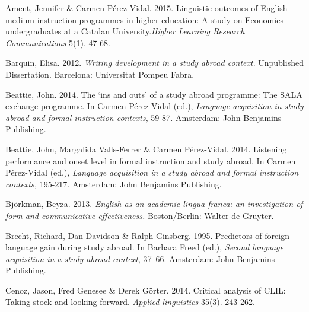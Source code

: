 \begin{styleStandard}
Ament, Jennifer \& Carmen Pérez Vidal. 2015. Linguistic outcomes of English medium instruction programmes in higher education: A study on Economics undergraduates at a Catalan University.\textit{Higher Learning Research Communications} 5(1). 47-68.
\end{styleStandard}


\begin{styleStandard}
Barquin, Elisa. 2012. \textit{Writing development in a study abroad context}. Unpublished Dissertation. Barcelona: Universitat Pompeu Fabra.
\end{styleStandard}


\begin{styleStandard}
Beattie, John. 2014. The ‘ins and outs’ of a study abroad programme: The SALA exchange programme. In Carmen Pérez-Vidal (ed.), \textit{Language acquisition in study abroad and formal instruction contexts, }59-87\textit{. }Amsterdam: John Benjamins Publishing. 
\end{styleStandard}


\begin{styleStandard}
Beattie, John, Margalida Valls-Ferrer \& Carmen Pérez-Vidal. 2014. Listening performance and onset level in formal instruction and study abroad. In Carmen Pérez-Vidal (ed.), \textit{Language acquisition in a study abroad and formal instruction contexts, }195-217. Amsterdam: John Benjamins Publishing. 
\end{styleStandard}


\begin{styleStandard}
Björkman, Beyza. 2013. \textit{English as an academic lingua franca: an investigation of form and communicative effectiveness. }Boston/Berlin: Walter de Gruyter. 
\end{styleStandard}

\begin{styleStandard}
Brecht, Richard, Dan Davidson \& Ralph Ginsberg. 1995. Predictors of foreign language gain during study abroad. In Barbara Freed (ed.), \textit{Second language acquisition in a study abroad context}, 37–66. Amsterdam: John Benjamins Publishing. 
\end{styleStandard}

\begin{styleStandard}
Cenoz, Jason, Fred Genesee \& Derek Görter. 2014. Critical analysis of CLIL: Taking stock and looking forward. \textit{Applied linguistics} 35(3). 243-262.
\end{styleStandard}


